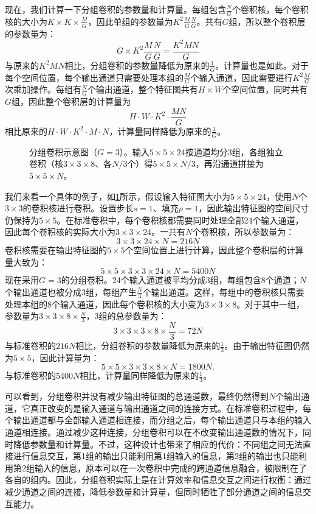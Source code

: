 现在，我们计算一下分组卷积的参数量和计算量。每组包含$\frac{N}{G}$个卷积核，每个卷积核的大小为$K\times K\times\frac{M}{G}$，因此单组的参数量为$K^2\frac{M}{G}\frac{N}{G}$。共有$G$组，所以整个卷积层的参数量为：
$$
G\times K^2\frac{M}{G}\frac{N}{G}=\frac{K^2MN}{G}
$$
与原来的$K^2MN$相比，分组卷积的参数量降低为原来的$\frac{1}{G}$。计算量也是如此。对于每个空间位置，每个输出通道只需要处理本组的$\frac{M}{G}$个输入通道，因此需要进行$K^2\frac{M}{G}$次乘加操作。每组有$\frac{N}{G}$个输出通道，整个特征图共有$H\times W$个空间位置，同时共有$G$组，因此整个卷积层的计算量为
$$
H\cdot W\cdot K^2\cdot\frac{MN}{G}
$$
相比原来的$H\cdot W\cdot K^2\cdot M\cdot N$，计算量同样降低为原来的$\frac{1}{G}$。

\begin{figure}[H]
    \caption{分组卷积示意图（$G=3$）。输入$5\times 5\times 24$按通道均分3组，各组独立卷积（核$3\times 3\times 8$、各$N/3$个）得$5\times 5\times N/3$，再沿通道拼接为$5\times 5\times N$。}
    \label{fig:group}
\end{figure}

我们来看一个具体的例子，如\cref{fig:group}所示，假设输入特征图大小为$5\times5\times24$，使用$N$个$3\times3$的卷积核进行卷积。设置步长$s=1$、填充$p=1$，因此输出特征图的空间尺寸仍保持为$5\times5$。在标准卷积中，每个卷积核都需要同时处理全部24个输入通道，因此每个卷积核的实际大小为$3\times3\times24$。一共有$N$个卷积核，所以参数量为：
$$
3\times3\times24\times N=216N
$$
卷积核需要在输出特征图的$5\times5$个空间位置上进行计算，因此整个卷积层的计算量大致为：
$$
5\times5\times3\times3\times24\times N=5400N
$$
现在采用$G=3$的分组卷积。24个输入通道被平均分成3组，每组包含8个通道；$N$个输出通道也被分成3组，每组产生$\frac{N}{3}$个输出通道。这样，每组中的卷积核只需要处理本组的8个输入通道，因此每个卷积核的大小变为$3\times3\times8$。对于其中一组，参数量为$3\times3\times8\times\frac{N}{3}$，3组的总参数量为：
$$
3\times3\times3\times8\times\frac{N}{3}=72N
$$
与标准卷积的$216N$相比，分组卷积的参数量降低为原来的$\frac{1}{3}$。由于输出特征图仍然为$5\times5$，因此计算量为：
$$
5\times5\times3\times3\times8\times N=1800N.
$$
与标准卷积的$5400N$相比，计算量同样降低为原来的$\frac{1}{3}$。

可以看到，分组卷积并没有减少输出特征图的总通道数，最终仍然得到$N$个输出通道，它真正改变的是输入通道与输出通道之间的连接方式。在标准卷积过程中，每个输出通道都与全部输入通道相连接，而分组之后，每个输出通道只与本组的输入通道相连接。通过减少这种连接，分组卷积可以在不改变输出通道数的情况下，同时降低参数量和计算量。不过，这种设计也带来了相应的代价：不同组之间无法直接进行信息交互，第1组的输出只能利用第1组输入的信息，第2组的输出也只能利用第2组输入的信息，原本可以在一次卷积中完成的跨通道信息融合，被限制在了各自的组内。因此，分组卷积实际上是在计算效率和信息交互之间进行权衡：通过减少通道之间的连接，降低参数量和计算量，但同时牺牲了部分通道之间的信息交互能力。

